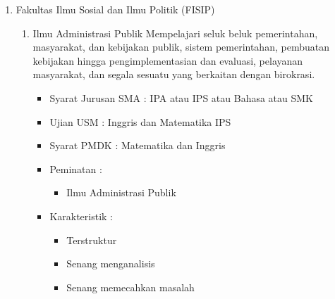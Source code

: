 \documentclass[a4paper,twoside]{article}
\begin{document}
\begin{enumerate}
\begin{enumerate}
			\item Fakultas Ilmu Sosial dan Ilmu Politik (FISIP)
			\begin{enumerate}
				\item Ilmu Administrasi Publik
					Mempelajari seluk beluk pemerintahan, masyarakat, dan kebijakan publik, sistem pemerintahan, pembuatan kebijakan hingga pengimplementasian dan evaluasi, pelayanan masyarakat, dan segala sesuatu yang berkaitan dengan birokrasi.
					\begin{itemize}
						\item Syarat Jurusan SMA : IPA atau IPS atau Bahasa atau SMK
						\item Ujian USM : Inggris dan Matematika IPS
						\item Syarat PMDK : Matematika dan Inggris
						\item Peminatan :
						\begin{itemize}
							\item Ilmu Administrasi Publik
						\end{itemize}
						\item Karakteristik :
						\begin{itemize}
							\item Terstruktur
							\item Senang menganalisis
							\item Senang memecahkan masalah
						\end{itemize}
					\end{itemize}
					

\end{enumerate}
\end{enumerate}
\end{enumerate}
\end{document}
